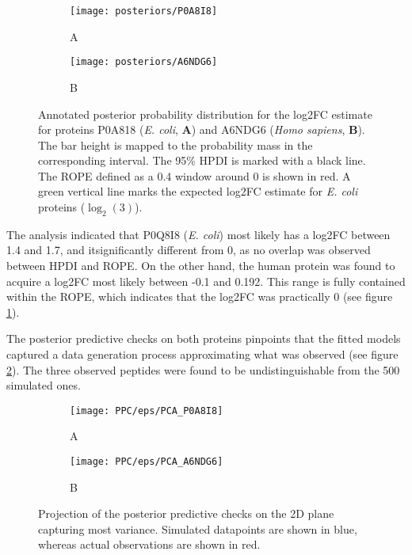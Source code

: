 \begin{figure}[!h]
\centering
\begin{subfigure}{0.8\textwidth}
\caption*{A}
\texttt{[image: posteriors/P0A8I8]}
\end{subfigure}
\bigskip
\begin{subfigure}{0.8\textwidth}
\caption*{B}
\texttt{[image: posteriors/A6NDG6]}
\end{subfigure}
\caption[Posteriors for 2 proteins]{Annotated posterior probability distribution for the \ac{log2FC} estimate for proteins P0A818 (\textit{E. coli}, \textbf{A}) and A6NDG6 (\textit{Homo sapiens}, \textbf{B}). The bar height is mapped to the probability mass in the corresponding interval. The 95\% \ac{HPDI} is marked with a black line. The \ac{ROPE} defined as a 0.4 window around 0 is shown in red. A green vertical line marks the expected \ac{log2FC} estimate for \textit{E. coli} proteins ($\log_2(3)$).}
\label{fig:posteriors}
\end{figure}

The analysis indicated that P0Q8I8 (\textit{E. coli}) most likely has a \ac{log2FC} between 1.4 and 1.7, and it\textquotesingle significantly different from 0, as no overlap was observed between \ac{HPDI} and \ac{ROPE}. On the other hand, the human protein was found to acquire a \ac{log2FC} most likely between -0.1 and 0.192. This range is fully contained within the \ac{ROPE}, which indicates that the \ac{log2FC} was practically 0 (see figure \ref{fig:posteriors}).


The posterior predictive checks on both proteins pinpoints that the fitted models captured a data generation process approximating what was observed (see figure \ref{fig:ppc}). The three observed peptides were found to be undistinguishable from the 500 simulated ones.

\begin{figure}[!h]
\centering
\begin{subfigure}{0.8\textwidth}
\caption*{A}
\texttt{[image: PPC/eps/PCA\_P0A8I8]}
\end{subfigure}
\bigskip
\begin{subfigure}{0.8\textwidth}
\caption*{B}
\texttt{[image: PPC/eps/PCA\_A6NDG6]}
\end{subfigure}
\caption[Posterior predictive checks]{Projection of the posterior predictive checks on the 2D plane capturing most variance. Simulated datapoints are shown in blue, whereas actual observations are shown in red.}
\label{fig:ppc}
\end{figure}


